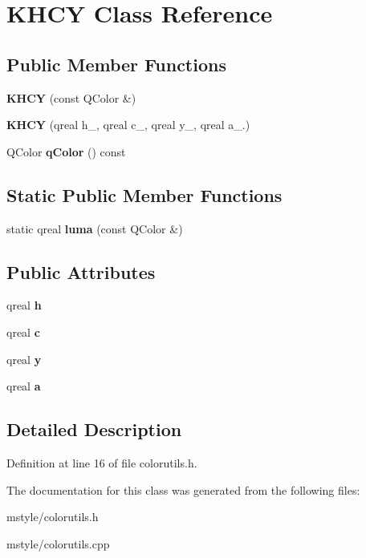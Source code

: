 \hypertarget{class_k_h_c_y}{}\section{K\+H\+CY Class Reference}
\label{class_k_h_c_y}
\subsection*{Public Member Functions}
\begin{DoxyCompactItemize}
\item 
\mbox{\label{class_k_h_c_y_ab4add6ff0cd378dccd69695e29143fac}} 
{\bfseries K\+H\+CY} (const Q\+Color \&)
\item 
\mbox{\label{class_k_h_c_y_a0b5d75def9b0baf52056b3c4dcc77b49}} 
{\bfseries K\+H\+CY} (qreal h\+\_\+, qreal c\+\_\+, qreal y\+\_\+, qreal a\+\_.)
\item 
\mbox{\label{class_k_h_c_y_a0f0e6c0403354fb7d13cddd374b6a794}} 
Q\+Color {\bfseries q\+Color} () const
\end{DoxyCompactItemize}
\subsection*{Static Public Member Functions}
\begin{DoxyCompactItemize}
\item 
\mbox{\label{class_k_h_c_y_aa03967b5e2c48148686e4c77020a7fcf}} 
static qreal {\bfseries luma} (const Q\+Color \&)
\end{DoxyCompactItemize}
\subsection*{Public Attributes}
\begin{DoxyCompactItemize}
\item 
\mbox{\label{class_k_h_c_y_a5792f1dae2490afc0c1a8ff627a02d72}} 
qreal {\bfseries h}
\item 
\mbox{\label{class_k_h_c_y_a396d226573d9c2d5329dec0ada84ce0a}} 
qreal {\bfseries c}
\item 
\mbox{\label{class_k_h_c_y_aca7de4944e0008d9659ef1cfd7d85352}} 
qreal {\bfseries y}
\item 
\mbox{\label{class_k_h_c_y_a2eb3bb9f6111307f4a9c2f1a400dc7f2}} 
qreal {\bfseries a}
\end{DoxyCompactItemize}


\subsection{Detailed Description}


Definition at line 16 of file colorutils.\+h.



The documentation for this class was generated from the following files\+:\begin{DoxyCompactItemize}
\item 
mstyle/colorutils.\+h\item 
mstyle/colorutils.\+cpp\end{DoxyCompactItemize}
